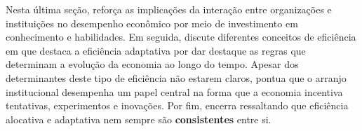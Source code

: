 Nesta última seção, \autor reforça as implicações da interação entre organizações e instituições no desempenho econômico por meio de investimento em conhecimento e habilidades. Em seguida, discute diferentes conceitos de eficiência em que destaca a eficiência adaptativa por dar destaque as regras que determinam a evolução da economia ao longo do tempo. Apesar dos determinantes deste tipo de eficiência não estarem claros, pontua que o arranjo institucional desempenha um papel central na forma que a economia incentiva tentativas, experimentos e inovações. Por fim, encerra ressaltando que eficiência alocativa e adaptativa nem sempre são \textbf{consistentes} entre si.